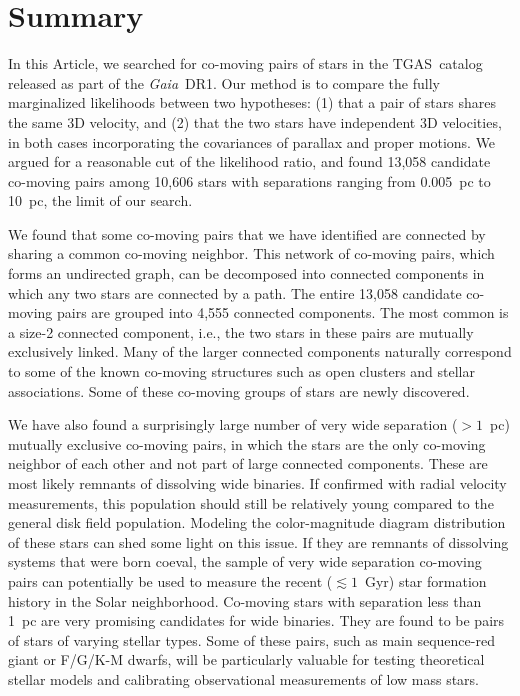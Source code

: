 \documentclass[manuscript, letterpaper]{aastex6}
\newcommand{\project}[1]{\textsl{#1}}
\newcommand{\acronym}[1]{{\small{#1}}}
\newcommand{\gaia}{\project{Gaia}}
\newcommand{\documentname}{Article}
\newcommand{\tgas}{\acronym{TGAS}}
\begin{document}
\section{Summary}\label{sec:summary}

In this \documentname, we searched for co-moving pairs of stars in the
\tgas\ catalog released as part of the \gaia\ DR1.
Our method is to compare the fully marginalized likelihoods between two
hypotheses: (1) that a pair of
stars shares the same 3D velocity, and (2) that the two stars have independent
3D velocities, in both cases incorporating the covariances of parallax and
proper motions.
We argued for a reasonable cut of the likelihood ratio, and found
13,058 candidate co-moving pairs among 10,606 stars
with separations ranging from 0.005~pc to 10~pc, the limit of our search.

We found that some co-moving pairs that we have identified are connected
by sharing a common co-moving neighbor.
This network of co-moving pairs, which forms an undirected graph,
can be decomposed into connected components in which any two stars are connected
by a path.
The entire 13,058 candidate co-moving pairs are grouped into 4,555 connected
components. The most common is a size-2 connected component, i.e., the two
stars in these pairs are mutually exclusively linked.
Many of the larger connected components
naturally correspond to some of the known co-moving structures
such as open clusters and stellar associations.
Some of these co-moving groups of stars are newly discovered.

We have also found a surprisingly large number of very wide separation ($>1$~pc)
mutually exclusive co-moving pairs, in which the stars are the only co-moving neighbor
of each other and not part of large connected components.
These are most likely remnants of dissolving wide binaries.
If confirmed with radial velocity measurements, this population should still be
relatively young compared to the general disk field population.
Modeling the color-magnitude diagram distribution of these stars can shed some
light on this issue.
If they are remnants of dissolving systems that were born coeval,
the sample of very wide separation co-moving pairs can potentially be used
to measure the recent ($\lesssim 1$~Gyr)
star formation history in the Solar neighborhood.
Co-moving stars with separation less than 1~pc are very promising candidates
for wide binaries. They are found to be pairs of stars of varying stellar types.
Some of these pairs, such as main sequence-red giant or F/G/K-M dwarfs,
will be particularly valuable for testing theoretical
stellar models and calibrating observational measurements of low mass stars.
\end{document}
